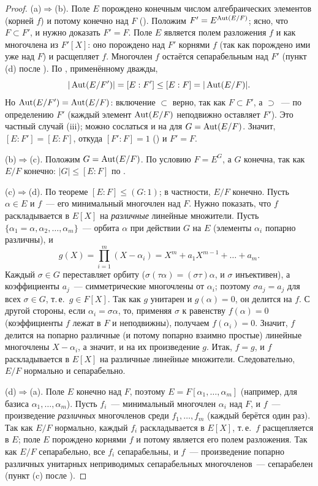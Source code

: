 \begin{proof}
(a)$\Rightarrow$(b). Поле $E$ порождено конечным числом алгебраических элементов (корней $f$) и потому конечно над $F$
(). Положим $F'=E^{\operatorname{Aut}(E/F)}$; ясно, что $F\subset F'$, и нужно доказать $F'=F$. Поле $E$ является полем
разложения $f$ и как многочлена из $F'[X]$: оно порождено над $F'$ корнями $f$ (так как порождено ими уже над $F$) и
расщепляет $f$. Многочлен $f$ остаётся сепарабельным над $F'$ (пункт (d) после ). По , применённому
дважды,
\[
|\operatorname{Aut}(E/F')|=[E:F']\le[E:F]=|\operatorname{Aut}(E/F)|.
\]
Но $\operatorname{Aut}(E/F')=\operatorname{Aut}(E/F)$: включение $\subset$ верно, так как $F\subset F'$, а $\supset$~--- по определению $F'$ (каждый
элемент $\operatorname{Aut}(E/F)$ неподвижно оставляет $F'$). Это частный случай (iii); можно сослаться и на  для
$G=\operatorname{Aut}(E/F)$. Значит, $[E:F']=[E:F]$, откуда $[F':F]=1$ () и $F'=F$.

(b)$\Rightarrow$(c). Положим $G=\operatorname{Aut}(E/F)$. По условию $F=E^G$, а $G$ конечна, так как $E/F$ конечно: $|G|\le[E:F]$ по .

(c)$\Rightarrow$(d). По теореме  $[E:F]\le(G:1)$; в частности, $E/F$ конечно. Пусть $\alpha\in E$ и $f$~--- его
минимальный многочлен над $F$. Нужно показать, что $f$ раскладывается в $E[X]$ на \emph{различные} линейные множители.
Пусть $\{\alpha_1=\alpha,\alpha_2,\dots,\alpha_m\}$~--- орбита $\alpha$ при действии $G$ на $E$ (элементы $\alpha_i$ попарно
различны), и
\[
g(X)=\prod_{i=1}^m(X-\alpha_i)=X^m+a_1X^{m-1}+\dots+a_m.
\]
Каждый $\sigma\in G$ переставляет орбиту ($\sigma(\tau\alpha)=(\sigma\tau)\alpha$, и $\sigma$ инъективен), а коэффициенты $a_j$~---
симметрические многочлены от $\alpha_i$; поэтому $\sigma a_j=a_j$ для всех $\sigma\in G$, т.\,е.\ $g\in F[X]$. Так как $g$
унитарен и $g(\alpha)=0$, он делится на $f$. С другой стороны, если $\alpha_i=\sigma\alpha$, то, применяя $\sigma$ к равенству
$f(\alpha)=0$ (коэффициенты $f$ лежат в $F$ и неподвижны), получаем $f(\alpha_i)=0$. Значит, $f$ делится на попарно
различные (и потому попарно взаимно простые) линейные многочлены $X-\alpha_i$, а значит, и на их произведение $g$. Итак,
$f=g$, и $f$ раскладывается в $E[X]$ на различные линейные множители. Следовательно, $E/F$ нормально и сепарабельно.

(d)$\Rightarrow$(a). Поле $E$ конечно над $F$, поэтому $E=F[\alpha_1,\dots,\alpha_m]$ (например, для базиса
$\alpha_1,\dots,\alpha_m$). Пусть $f_i$~--- минимальный многочлен $\alpha_i$ над $F$, и $f$~--- произведение \emph{различных}
многочленов среди $f_1,\dots,f_m$ (каждый берётся один раз). Так как $E/F$ нормально, каждый $f_i$ раскладывается в
$E[X]$, т.\,е.\ $f$ расщепляется в $E$; поле $E$ порождено корнями $f$ и потому является его полем разложения. Так как
$E/F$ сепарабельно, все $f_i$ сепарабельны, и $f$~--- произведение попарно различных унитарных неприводимых
сепарабельных многочленов~--- сепарабелен (пункт (c) после ).
\end{proof}

